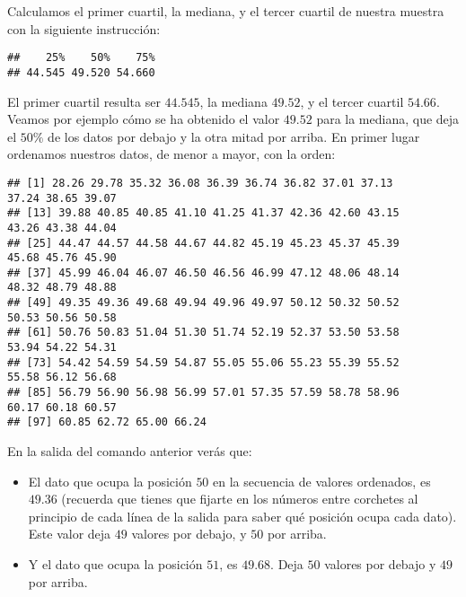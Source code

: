 \documentclass[
  degree=mecinf,
  title=normal,
  toc=normal,
  bib=normal]{mnye}
\newenvironment{Shaded}{\begin{snugshade}}{\end{snugshade}}
\newcommand{\AttributeTok}[1]{\textcolor[rgb]{0.77,0.63,0.00}{#1}}
\newcommand{\FloatTok}[1]{\textcolor[rgb]{0.00,0.00,0.81}{#1}}
\newcommand{\FunctionTok}[1]{\textcolor[rgb]{0.00,0.00,0.00}{#1}}
\newcommand{\NormalTok}[1]{#1}
\newcommand{\SpecialCharTok}[1]{\textcolor[rgb]{0.00,0.00,0.00}{#1}}
\begin{document}
Calculamos el primer cuartil, la mediana, y el tercer cuartil de nuestra muestra con la siguiente instrucción:

\begin{Shaded}
\end{Shaded}

\begin{verbatim}
##    25%    50%    75% 
## 44.545 49.520 54.660
\end{verbatim}

El primer cuartil resulta ser \(44.545\), la mediana \(49.52\), y el tercer cuartil \(54.66\). Veamos por ejemplo cómo se ha obtenido el valor \(49.52\) para la mediana, que deja el \(50\%\) de los datos por debajo y la otra mitad por arriba. En primer lugar ordenamos nuestros datos, de menor a mayor, con la orden:

\begin{Shaded}
\end{Shaded}

\begin{verbatim}
## [1] 28.26 29.78 35.32 36.08 36.39 36.74 36.82 37.01 37.13
37.24 38.65 39.07
## [13] 39.88 40.85 40.85 41.10 41.25 41.37 42.36 42.60 43.15
43.26 43.38 44.04
## [25] 44.47 44.57 44.58 44.67 44.82 45.19 45.23 45.37 45.39
45.68 45.76 45.90
## [37] 45.99 46.04 46.07 46.50 46.56 46.99 47.12 48.06 48.14
48.32 48.79 48.88
## [49] 49.35 49.36 49.68 49.94 49.96 49.97 50.12 50.32 50.52
50.53 50.56 50.58
## [61] 50.76 50.83 51.04 51.30 51.74 52.19 52.37 53.50 53.58
53.94 54.22 54.31
## [73] 54.42 54.59 54.59 54.87 55.05 55.06 55.23 55.39 55.52
55.58 56.12 56.68
## [85] 56.79 56.90 56.98 56.99 57.01 57.35 57.59 58.78 58.96
60.17 60.18 60.57
## [97] 60.85 62.72 65.00 66.24
\end{verbatim}

En la salida del comando anterior verás que:

\begin{itemize}
\item
  El dato que ocupa la posición \(50\) en la secuencia de valores ordenados, es \(49.36\) (recuerda que tienes que fijarte en los números entre corchetes al principio de cada línea de la salida para saber qué posición ocupa cada dato). Este valor deja \(49\) valores por debajo, y \(50\) por arriba.
\item
  Y el dato que ocupa la posición \(51\), es \(49.68\). Deja \(50\) valores por debajo y \(49\) por arriba.
\end{itemize}
\end{document}
